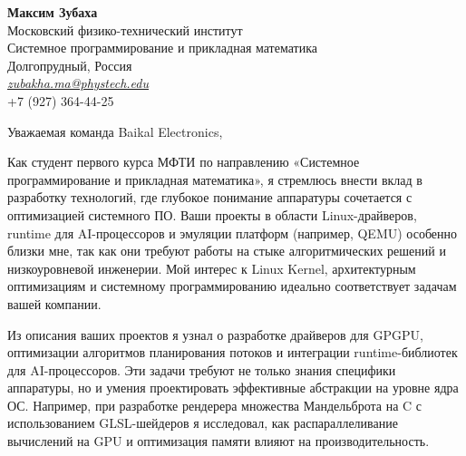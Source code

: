 \documentclass[11pt]{report}
\begin{document}
\begin{titlepage}

\begin{large}


\raggedright \textbf{Максим Зубаха} \\ Московский физико-технический институт \\ Системное программирование и прикладная математика \\ Долгопрудный, Россия \\ \href{zubakha.ma@phystech.edu}{\textit{zubakha.ma@phystech.edu}} \\ +7 (927) 364-44-25 \\

\vspace{0.7em}

\raggedright Уважаемая команда Baikal Electronics, \\

\vspace{0.7em}

Как студент первого курса МФТИ по направлению «Системное программирование и прикладная математика», я стремлюсь внести вклад в разработку технологий, где глубокое понимание аппаратуры сочетается с оптимизацией системного ПО. Ваши проекты в области Linux-драйверов, runtime для AI-процессоров и эмуляции платформ (например, QEMU) особенно близки мне, так как они требуют работы на стыке алгоритмических решений и низкоуровневой инженерии. Мой интерес к Linux Kernel, архитектурным оптимизациям и системному программированию идеально соответствует задачам вашей компании.

\vspace{0.7em}

Из описания ваших проектов я узнал о разработке драйверов для GPGPU, оптимизации алгоритмов планирования потоков и интеграции runtime-библиотек для AI-процессоров. Эти задачи требуют не только знания специфики аппаратуры, но и умения проектировать эффективные абстракции на уровне ядра ОС. Например, при разработке рендерера множества Мандельброта на C с использованием GLSL-шейдеров я исследовал, как распараллеливание вычислений на GPU и оптимизация памяти влияют на производительность. 


\end{large}
\end{titlepage}
\end{document}
